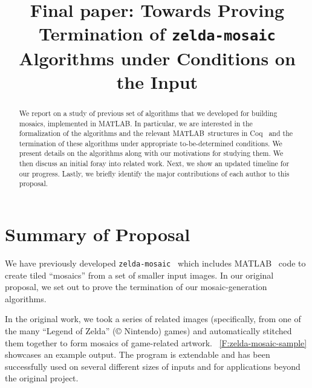 \documentclass[11pt,conference]{IEEEtran}
\newcommand{\matlab}{MATLAB}
\theoremstyle{plain} %
\theoremstyle{definition}
\theoremstyle{remark}
\begin{document}
\title{Final paper: Towards Proving Termination of \texttt{zelda-mosaic} Algorithms under Conditions on the Input}

\author{
\and
{}
}

\maketitle

\begin{abstract}
    We report on a study of previous set of algorithms that we developed for
    building mosaics, implemented in \matlab\@. In particular, we are interested
    in the formalization of the algorithms and the relevant \matlab\ structures
    in Coq~\cite{Coq} and the termination of these algorithms under appropriate
    to-be-determined conditions. We present details on the algorithms along with
    our motivations for studying them. We then discuss an initial foray into
    related work. Next, we show an updated timeline for our progress. Lastly, we
    briefly identify the major contributions of each author to this proposal.
\end{abstract}


\section{Summary of Proposal}

We have previously developed \texttt{zelda-mosaic}~\cite{zelda_mosaic} which
includes \matlab~\cite{matlab} code to create tiled ``mosaics'' from a set of
smaller input images. In our original proposal, we set out to prove the
termination of our mosaic-generation algorithms.

In the original work, we took a series of related images (specifically, from one
of the many ``Legend of Zelda'' ({\copyright} Nintendo) games) and automatically
stitched them together to form mosaics of game-related artwork.
\figurename~\ref{F:zelda-mosaic-sample} showcases an example output. The program
is extendable and has been successfully used on several different sizes of
inputs and for applications beyond the original project.
\end{document}
